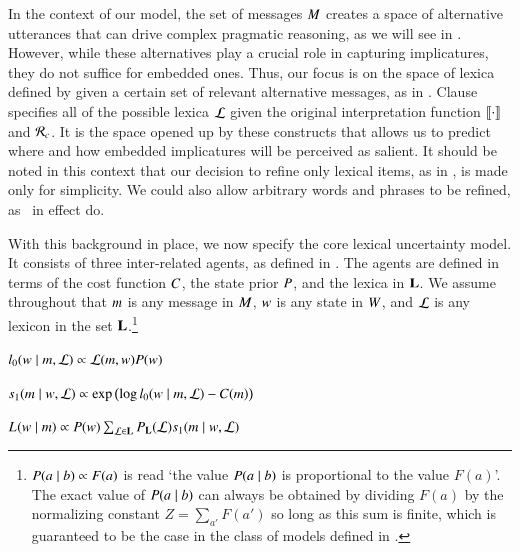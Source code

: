 \documentclass[leqno,12pt]{article}
\begin{document}

In the context of our model, the set of messages $M$ creates a
space of alternative utterances that can drive complex pragmatic
reasoning, as we will see in .  However,
while these alternatives play a crucial role in capturing
implicatures, they do not suffice for embedded ones. Thus, our focus
is on the space of lexica defined by  given
a certain set of relevant alternative messages, as in
. Clause~
specifies all of the possible lexica $\mathcal{L}$ given the original
interpretation function $\llbracket\cdot\rrbracket$ and $\mathcal{R}_{c}$.  It is the space
opened up by these constructs that allows us to predict where and how
embedded implicatures will be perceived as salient.  It should be
noted in this context that our decision to refine only lexical items,
as in , is made only for simplicity. We
could also allow arbitrary words and phrases to be refined, as \CFS\
in effect do.

With this background in place, we now specify the core lexical
uncertainty model. It consists of three inter-related agents, as
defined in \eg{agents}. The agents are defined in terms of the cost
function $C$, the state prior $P$, and the lexica in
$\mathbf{L}$.  We assume throughout that $m$ is any message in
$M$, $w$ is any state in $W$, and $\mathcal{L}$ is any
lexicon in the set $\mathbf{L}$.\footnote{$P(a \mid b) \propto F(a)$ is
  read `the value $P(a \mid b)$ is proportional to the value
  $F(a)$'. The exact value of $P(a \mid b)$ can always be obtained by
  dividing $F(a)$ by the normalizing constant $Z=\sum_{a'} F(a')$ so
  long as this sum is finite, which is guaranteed to be the case in
  the class of models defined in \eg{modobjects}.}
%
\begin{examples}
\item\label{agents}
  \begin{examples}

  \item\label{l0}%
    $l_{0}(w \mid m, \mathcal{L}) \propto \mathcal{L}(m, w)P(w)$

  \item\label{s1}%
    $s_{1}(m \mid w, \mathcal{L}) \propto
    \exp
    \left(
      \log l_{0}(w \mid m, \mathcal{L})
      - 
      C(m)
    \right)$
    
  \item\label{L} 
    $L_{}(w \mid m) 
    \propto 
    P(w)
    \sum_{\mathcal{L} \in \mathbf{L}}
    P_{\mathbf{L}}(\mathcal{L})
    s_{1}(m \mid w, \mathcal{L})$
  \end{examples}
\end{examples}
\end{document}
